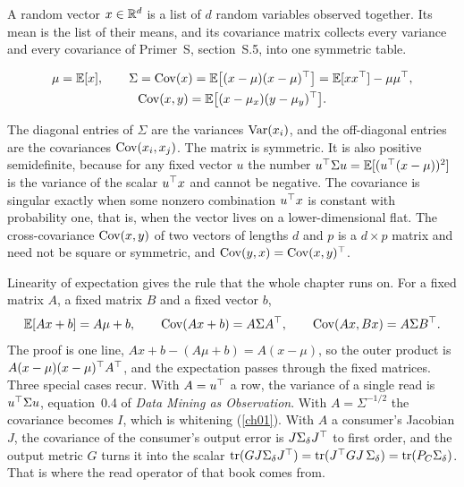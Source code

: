 A random vector $x\in\mathbb{R}^d$ is a list of $d$ random variables observed
together. Its mean is the list of their means, and its covariance matrix
collects every variance and every covariance of Primer~S, section~S.5, into
one symmetric table.

\begin{definition}\label{def:ch02:cov}
\begin{equation}\label{eq:ch02:cov}
\begin{gathered}
\mu=\mathbb{E}[x],\qquad
\Sigma=\operatorname{Cov}(x)=\mathbb{E}\big[(x-\mu)(x-\mu)^{\top}\big]=\mathbb{E}[xx^{\top}]-\mu\mu^{\top},\\
\operatorname{Cov}(x,y)=\mathbb{E}\big[(x-\mu_x)(y-\mu_y)^{\top}\big].
\end{gathered}
\end{equation}
\end{definition}

The diagonal entries of $\Sigma$ are the variances $\operatorname{Var}(x_i)$, and the
off-diagonal entries are the covariances $\operatorname{Cov}(x_i,x_j)$. The matrix is
symmetric. It is also positive semidefinite, because for any fixed vector $u$
the number $u^{\top}\Sigma u=\mathbb{E}[(u^{\top}(x-\mu))^2]$ is the variance of the scalar
$u^{\top} x$ and cannot be negative. The covariance is singular exactly when some
nonzero combination $u^{\top} x$ is constant with probability one, that is, when the vector lives on a
lower-dimensional flat. The cross-covariance $\operatorname{Cov}(x,y)$ of two vectors of
lengths $d$ and $p$ is a $d\times p$ matrix and need not be square or symmetric,
and $\operatorname{Cov}(y,x)=\operatorname{Cov}(x,y)^{\top}$.

Linearity of expectation gives the rule that the whole chapter runs on. For a
fixed matrix $A$, a fixed matrix $B$ and a fixed vector $b$,
\begin{equation}\label{eq:ch02:linmap}
\mathbb{E}[Ax+b]=A\mu+b,\qquad \operatorname{Cov}(Ax+b)=A\Sigma A^{\top},\qquad \operatorname{Cov}(Ax,Bx)=A\Sigma B^{\top} .
\end{equation}
The proof is one line, $Ax+b-(A\mu+b)=A(x-\mu)$, so the outer product is
$A(x-\mu)(x-\mu)^{\top} A^{\top}$, and the expectation passes through the fixed
matrices. Three special cases recur. With $A=u^{\top}$ a row, the variance of a
single read is $u^{\top}\Sigma u$, equation~0.4 of \emph{Data Mining as Observation}. With $A=\Sigma^{-1/2}$
the covariance becomes $I$, which is whitening (\cref{ch01}). With $A$ a
consumer's Jacobian $J$, the covariance of the consumer's output error is
$J\Sigma_\delta J^{\top}$ to first order, and the output metric $G$ turns it into the scalar
$\operatorname{tr}(GJ\Sigma_\delta J^{\top})=\operatorname{tr}(J^{\top} GJ\,\Sigma_\delta)=\operatorname{tr}(P_C\Sigma_\delta)$. That is where the read operator
of that book comes from.

